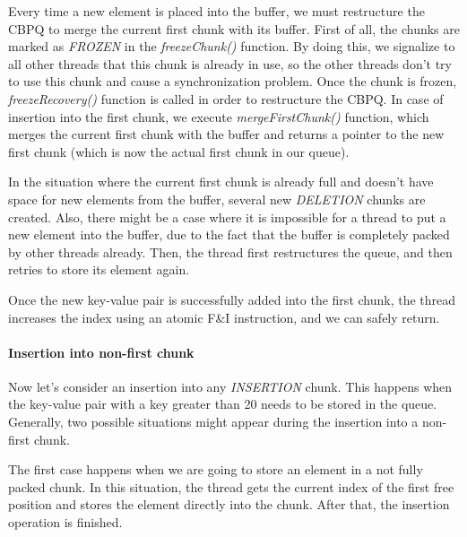 \documentclass{article}
\begin{document}
Every time a new element is placed into the buffer, we must restructure the CBPQ to merge the current first chunk with its buffer. First of all, the chunks are marked as \emph{FROZEN} in the \textit{freezeChunk()} function. By doing this, we signalize to all other threads that this chunk is already in use, so the other threads don't try to use this chunk and cause a synchronization problem. Once the chunk is frozen, \textit{freezeRecovery()} function is called in order to restructure the CBPQ. In case of insertion into the first chunk, we execute \textit{mergeFirstChunk()} function, which merges the current first chunk with the buffer and returns a pointer to the new first chunk (which is now the actual first chunk in our queue).\par

In the situation where the current first chunk is already full and doesn't have space for new elements from the buffer, several new \emph{DELETION} chunks are created. Also, there might be a case where it is impossible for a thread to put a new element into the buffer, due to the fact that the buffer is completely packed by other threads already. Then, the thread first restructures the queue, and then retries to store its element again.\par

Once the new key-value pair is successfully added into the first chunk, the thread increases the index using an atomic F\&I instruction, and we can safely return.

\paragraph{Insertion into non-first chunk}\mbox{}\par

Now let's consider an insertion into any \emph{INSERTION} chunk. This happens when the key-value pair with a key greater than 20 needs to be stored in the queue. Generally, two possible situations might appear during the insertion into a non-first chunk.\par

The first case happens when we are going to store an element in a not fully packed chunk. In this situation, the thread gets the current index of the first free position and stores the element directly into the chunk. After that, the insertion operation is finished.\par
\end{document}
